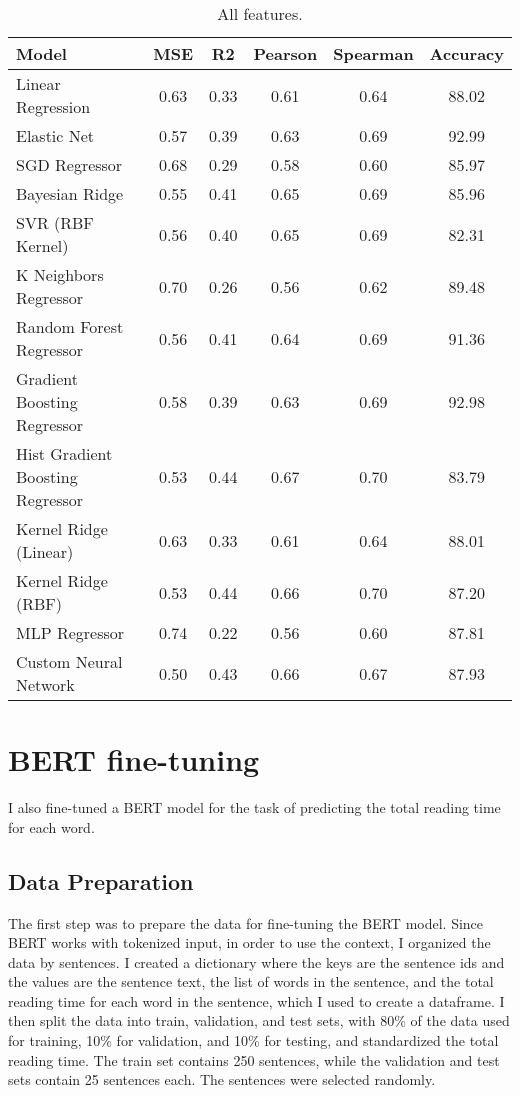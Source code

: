 \begin{table}[ht]
    \begin{subtable}[t]{\textwidth}
        \centering
        \begin{tabular}{|l|c|c|c|c|c|}
            \hline
            Model & MSE & R2 & Pearson & Spearman & Accuracy \\
            \hline
            Linear Regression & 0.63 & 0.33 & 0.61 & 0.64 & 88.02 \\
            Elastic Net & 0.57 & 0.39 & 0.63 & 0.69 & 92.99 \\
            SGD Regressor & 0.68 & 0.29 & 0.58 & 0.60 & 85.97 \\
            Bayesian Ridge & 0.55 & 0.41 & 0.65 & 0.69 & 85.96 \\
            SVR (RBF Kernel) & 0.56 & 0.40 & 0.65 & 0.69 & 82.31 \\
            K Neighbors Regressor & 0.70 & 0.26 & 0.56 & 0.62 & 89.48 \\
            Random Forest Regressor & 0.56 & 0.41 & 0.64 & 0.69 & 91.36 \\
            Gradient Boosting Regressor & 0.58 & 0.39 & 0.63 & 0.69 & 92.98 \\
            Hist Gradient Boosting Regressor & 0.53 & 0.44 & 0.67 & 0.70 & 83.79 \\
            Kernel Ridge (Linear) & 0.63 & 0.33 & 0.61 & 0.64 & 88.01 \\
            Kernel Ridge (RBF) & 0.53 & 0.44 & 0.66 & 0.70 & 87.20 \\
            MLP Regressor & 0.74 & 0.22 & 0.56 & 0.60 & 87.81 \\
            Custom Neural Network & 0.50 & 0.43 & 0.66 & 0.67 & 87.93 \\
            \hline
        \end{tabular}
        \caption{All features.}
        \label{tab:simple_models_results_all}
    \end{subtable}    
\end{table}


\section{BERT fine-tuning}
I also fine-tuned a BERT model for the task of predicting the total reading time for each word.

\subsection{Data Preparation}
The first step was to prepare the data for fine-tuning the BERT model. Since BERT works with tokenized input, in order to use the context, I organized the data by sentences. I created a dictionary where the keys are the sentence ids and the values are the sentence text, the list of words in the sentence, and the total reading time for each word in the sentence, which I used to create a dataframe. I then split the data into train, validation, and test sets, with 80\% of the data used for training, 10\% for validation, and 10\% for testing, and standardized the total reading time. The train set contains 250 sentences, while the validation and test sets contain 25 sentences each. The sentences were selected randomly.


